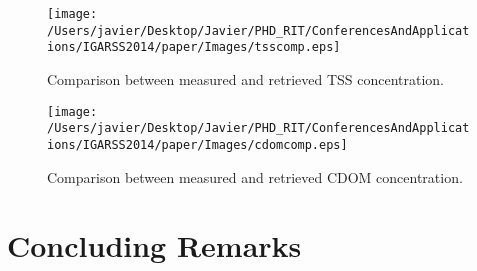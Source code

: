 \begin{figure}[htb]
\centering
    \texttt{[image: /Users/javier/Desktop/Javier/PHD\_RIT/ConferencesAndApplications/IGARSS2014/paper/Images/tsscomp.eps]}   
    \caption{Comparison between measured and retrieved TSS concentration.}
    \label{fig:tsscomp} 
\end{figure}  

\begin{figure}[htb]
\centering
    \texttt{[image: /Users/javier/Desktop/Javier/PHD\_RIT/ConferencesAndApplications/IGARSS2014/paper/Images/cdomcomp.eps]}    
    \caption{Comparison between measured and retrieved CDOM concentration.}
    \label{fig:cdomcomp} 
\end{figure}  

\section{Concluding Remarks}